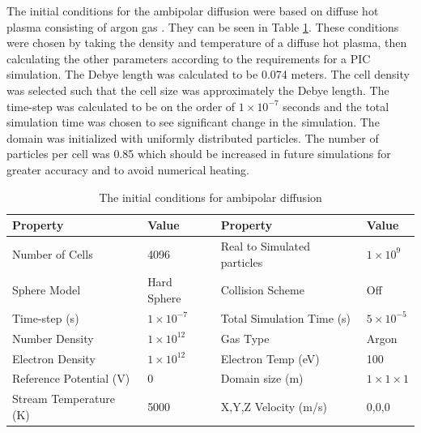 \indent The initial conditions for the ambipolar diffusion were based on diffuse hot plasma consisting of argon gas \cite{plasma_table}. They can be seen in Table \ref{tab:initialambipolar}. These conditions were chosen by taking the density and temperature of a diffuse hot plasma, then calculating the other parameters according to the requirements for a PIC simulation. The Debye length was calculated to be 0.074 meters. The cell density was selected such that the cell size was approximately the Debye length. The time-step was calculated to be on the order of \(1\times 10^{-7}\) seconds and the total simulation time was chosen to see significant change in the simulation. The domain was initialized with uniformly distributed particles. The number of particles per cell was 0.85 which should be increased in future simulations for greater accuracy and to avoid numerical heating. \par

\begin{table}
\caption{The initial conditions for ambipolar diffusion}
\vspace{0.3cm}
\begin{tabular}{|ll|ll|}
\hline
Property               & Value                & Property                    & Value                \\ \hline
Number of Cells        & 4096                 & Real to Simulated particles & \(1 \times 10^9\)    \\
Sphere Model           & Hard Sphere          & Collision Scheme            & Off                  \\
Time-step (s)          & \(1 \times 10^{-7}\) & Total Simulation  Time (s)  & \(5 \times 10^{-5}\) \\
Number Density         & \(1 \times 10^{12}\) & Gas Type                    & Argon                \\
Electron Density       & \(1 \times 10^{12}\) & Electron Temp (eV)          & 100                  \\
Reference Potential (V)       & 0 & Domain size (m)          & \(1\times 1 \times 1\)                  \\
Stream Temperature (K) & 5000                 & X,Y,Z Velocity (m/s)              & 0,0,0 \\ \hline
\end{tabular}
\label{tab:initialambipolar}

\end{table}

